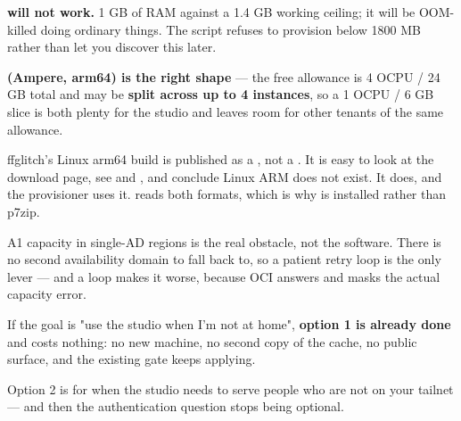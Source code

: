 \documentclass[fontpath=fonts/,logopath=logo/]{riposte-doc}
\begin{document}
\begin{ripbullets}
\item \textbf{ will not work.} 1 GB of RAM against a 1.4 GB working ceiling; it will be OOM-killed doing ordinary things. The script refuses to provision below 1800 MB rather than let you discover this later.
\item \textbf{ (Ampere, arm64) is the right shape} — the free allowance is 4 OCPU / 24 GB total and may be \textbf{split across up to 4 instances}, so a 1 OCPU / 6 GB slice is both plenty for the studio and leaves room for other tenants of the same allowance.
\item ffglitch's Linux arm64 build is published as a \textbf{}, not a . It is easy to look at the download page, see  and , and conclude Linux ARM does not exist. It does, and the provisioner uses it.  reads both formats, which is why  is installed rather than p7zip.
\item A1 capacity in single-AD regions is the real obstacle, not the software. There is no second availability domain to fall back to, so a patient retry loop is the only lever — and a  loop makes it worse, because OCI answers  and masks the actual capacity error.
\end{ripbullets}



If the goal is "use the studio when I'm not at home", \textbf{option 1 is already done} and costs nothing: no new machine, no second copy of the cache, no public surface, and the existing gate keeps applying.

Option 2 is for when the studio needs to serve people who are not on your tailnet — and then the authentication question stops being optional.

\ripend
\end{document}

